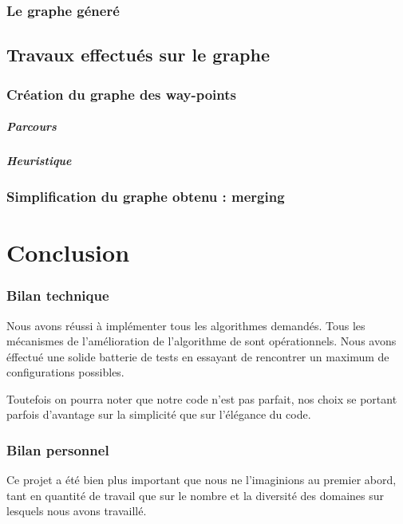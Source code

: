 \documentclass[a4paper,12pt]{report}
\begin{document}
\subsection{Le graphe géneré}

\section{Travaux effectués sur le graphe}

\subsection{Création du graphe des way-points}

\paragraph{Parcours}
\paragraph{Heuristique}

\subsection{Simplification du graphe obtenu : merging}

\chapter{Conclusion}

\subsection*{Bilan technique}

Nous avons réussi à implémenter tous les algorithmes demandés. Tous les mécanismes de l'amélioration de l'algorithme de \nt sont opérationnels. Nous avons éffectué une solide batterie de tests en essayant de rencontrer un maximum de configurations possibles.

Toutefois on pourra noter que notre code n'est pas parfait, nos choix se portant parfois d'avantage sur la simplicité que sur l'élégance du code. 

\subsection*{Bilan personnel}

Ce projet a été bien plus important que nous ne l'imaginions au premier abord, tant en quantité de travail que sur le nombre et la diversité des domaines sur lesquels nous avons travaillé.
\end{document}
